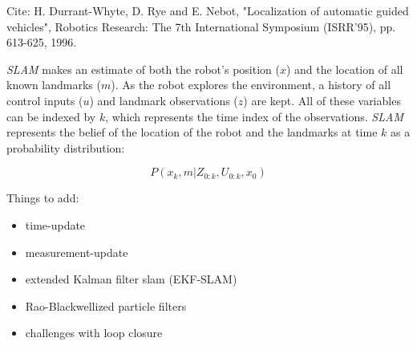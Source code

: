Cite: H. Durrant-Whyte, D. Rye and E. Nebot, "Localization of automatic guided vehicles", Robotics Research: The 7th International Symposium (ISRR'95), pp. 613-625, 1996.

\textit{SLAM} makes an estimate of both the robot's position ($x$) and the location of all known landmarks ($m$).  As the robot
explores the environment, a history of all control inputs ($u$) and landmark observations ($z$) are kept.  All of
these variables can be indexed by $k$, which represents the time index of the observations.  \textit{SLAM}
represents the belief of the location of the robot and the landmarks at time $k$ as a probability
distribution:


\begin{center}
\begin{equation}
P(x_k,m | Z_{0:k}, U_{0:k}, x_0)
\end{equation}
\end{center}

Things to add:
\begin{itemize}
\item time-update
\item measurement-update
\item extended Kalman filter slam (EKF-SLAM)
\item Rao-Blackwellized particle filters
\item challenges with loop closure

\end{itemize}


